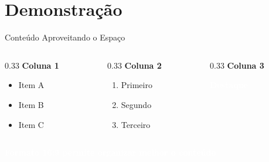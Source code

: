 \documentclass[aspectratio=169]{beamer}
\begin{document}
\section{Demonstração}
\begin{frame}{Conteúdo Aproveitando o Espaço}
    \begin{columns}
        \begin{column}{0.33\textwidth}
            \textbf{Coluna 1}
            \begin{itemize}
                \item Item A
                \item Item B
                \item Item C
            \end{itemize}
        \end{column}
        \begin{column}{0.33\textwidth}
            \textbf{Coluna 2}
            \begin{enumerate}
                \item Primeiro
                \item Segundo
                \item Terceiro
            \end{enumerate}
        \end{column}
        \begin{column}{0.33\textwidth}
            \textbf{Coluna 3}
            \begin{center}
                \textcolor{white}{\textbf{Destaque}}
                
                \vspace{0.5cm}
                \newtonlogo[0.8cm]
            \end{center}
        \end{column}
    \end{columns}
    
    \vspace{1cm}
    \begin{center}
        \textcolor{white}{\textbf{Formato 16:9 permite organizar melhor o conteúdo}}
    \end{center}
\end{frame}
\end{document}
